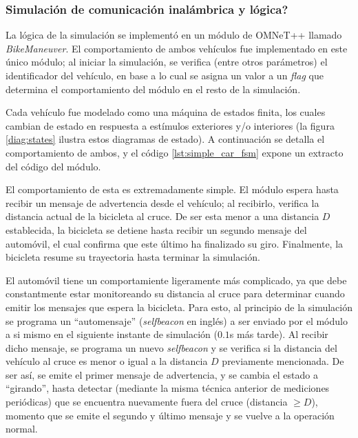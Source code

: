\documentclass[11pt,letterpaper]{article}
\begin{document}
\subsubsection{Simulación de comunicación inalámbrica y lógica?}\label{section:prot_communication}

La lógica de la simulación se implementó en un módulo de OMNeT++ llamado \emph{BikeManeuver}. El comportamiento de ambos vehículos fue implementado en este único módulo; al iniciar la simulación, se verifica (entre otros parámetros) el identificador del vehículo, en base a lo cual se asigna un valor a un \emph{flag} que determina el comportamiento del módulo en el resto de la simulación.

Cada vehículo fue modelado como una máquina de estados finita, los cuales cambian de estado en respuesta a estímulos exteriores y/o interiores (la figura \ref{diag:states} ilustra estos diagramas de estado). A continuación se detalla el comportamiento de ambos, y el código \ref{lst:simple_car_fsm} expone un extracto del código del módulo.

\begin{description}[leftmargin=!,labelwidth=\widthof{\bfseries Automóvil}]
    \item [Bicicleta]  El comportamiento de esta es extremadamente simple. El módulo espera hasta recibir un mensaje de advertencia desde el vehículo; al recibirlo, verifica la distancia actual de la bicicleta al cruce. De ser esta menor a una distancia $D$ establecida, la bicicleta se detiene hasta recibir un segundo mensaje del automóvil, el cual confirma que este último ha finalizado su giro. Finalmente, la bicicleta resume su trayectoria hasta terminar la simulación.
    \item [Automóvil]  El automóvil tiene un comportamiente ligeramente más complicado, ya que debe constantmente estar monitoreando su distancia al cruce para determinar cuando emitir los mensajes que espera la bicicleta. Para esto, al principio de la simulación se programa un ``automensaje'' (\emph{selfbeacon} en inglés) a ser enviado por el módulo a si mismo en el siguiente instante de simulación ($0.1$s más tarde). Al recibir dicho mensaje, se programa un nuevo \emph{selfbeacon} y se verifica si la distancia del vehículo al cruce es menor o igual a la distancia $D$ previamente mencionada. De ser así, se emite el primer mensaje de advertencia, y se cambia el estado a ``girando'', hasta detectar (mediante la misma técnica anterior de mediciones periódicas) que se encuentra nuevamente fuera del cruce (distancia $\geq D$), momento que se emite el segundo y último mensaje y se vuelve a la operación normal.
\end{description}
\end{document}

